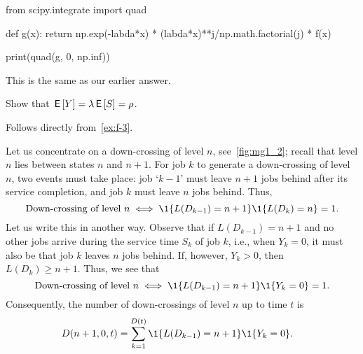 \documentclass[companion]{subfiles}
\begin{document}
\begin{exercise}
\begin{solution}
\begin{pyconsole}
from scipy.integrate import quad

def g(x):
 return np.exp(-labda*x) * (labda*x)**j/np.math.factorial(j) * f(x)

print(quad(g, 0, np.inf))
\end{pyconsole}

This is the same as our earlier answer.
\end{solution}
\end{exercise}

\begin{exercise}
Show that $\,\mathsf{E}\left[Y\right] = \lambda \,\mathsf{E}\left[S\right] = \rho$.
\begin{solution}
Follows directly from~\cref{ex:f-3}. 
\end{solution}
\end{exercise}

Let us concentrate on a down-crossing of level $n$, see~\cref{fig:mg1_2}; recall that level $n$ lies between states $n$ and $n+1$.
For job $k$ to generate a down-crossing of level $n$, two events must take place: job `$k-1$' must leave $n+1$ jobs behind after its service completion, and job $k$ must leave $n$ jobs behind.
Thus,
 \begin{equation*}
 \text{Down-crossing of level $n$} \iff \1{L(D_{k-1}) = n+1}\1{L(D_k)=n} = 1.
 \end{equation*}
Let us write this in another
way. Observe that if $L(D_{k-1})=n+1$ and no other jobs arrive during
the service time $S_k$ of job $k$, i.e., when $Y_k=0$, it must also be
that job $k$ leaves $n$ jobs behind. If, however, $Y_k>0$, then
$L(D_k)\geq n+1$. Thus, we see that
 \begin{equation*}
 \text{Down-crossing of level $n$} \iff \1{L(D_{k-1}) = n+1}\1{Y_k=0} = 1.
 \end{equation*}
Consequently, the number of down-crossings of level $n$ up to time $t$ is
\begin{equation*}
 \begin{split}
 D(n+1, 0, t) 
&= \sum_{k=1}^{D(t)}\1{L(D_{k-1})=n+1}\1{Y_k=0}.
 \end{split}
\end{equation*}
\end{document}
